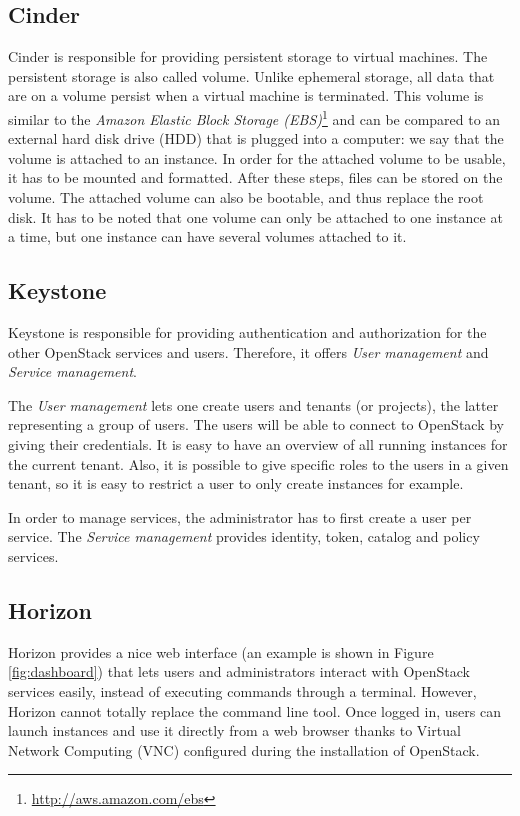 \subsection{Cinder}
Cinder is responsible for providing persistent storage to virtual machines. 
The persistent storage is also called volume. 
Unlike ephemeral storage, all data that are on a volume persist when a virtual machine is terminated. 
This volume is similar to the \textit{Amazon Elastic Block Storage (EBS)}\footnote{\url{http://aws.amazon.com/ebs}} 
and can be compared to an external hard disk drive (HDD) that is plugged into a computer: we say that the volume is attached to an instance. 
In order for the attached volume to be usable, it has to be mounted and formatted. 
After these steps, files can be stored on the volume. 
The attached volume can also be bootable, and thus replace the root disk.
It has to be noted that one volume can only be attached to one instance at a time, but one instance can have several volumes attached to it.


\subsection{Keystone}
Keystone is responsible for providing authentication and authorization for the other OpenStack services and users. 
Therefore, it offers \textit{User management} and \textit{Service management}. 

The \textit{User management} lets one create users and tenants (or projects), the latter representing a group of users. 
The users will be able to connect to OpenStack by giving their credentials.
It is easy to have an overview of all running instances for the current tenant.
Also, it is possible to give specific roles to the users in a given tenant, so it is easy to restrict a user to only create instances for example. 

In order to manage services, the administrator has to first create a user per service. 
The \textit{Service management} provides identity, token, catalog and policy services.



\subsection{Horizon}
Horizon provides a nice web interface (an example is shown in Figure \ref{fig:dashboard}) that lets users and administrators interact with OpenStack services easily, instead of executing commands through a terminal. 
However, Horizon cannot totally replace the command line tool.
Once logged in, users can launch instances and use it directly from a web browser thanks to Virtual Network Computing (VNC) configured during the installation of OpenStack.








